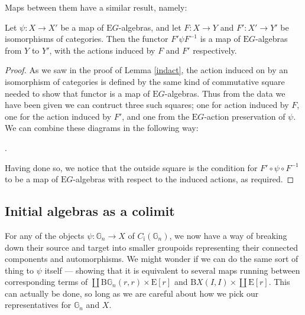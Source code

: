 \documentclass{amsart} %
\newenvironment{eq*}{\begin{equation*}}{\end{equation*}}
\begin{document}
Maps between them have a similar result, namely:

\begin{lem}\label{indmap} Let $\psi: X \to X'$ be a map of $\mathrm{E}G$-algebras, and let $F: X \to Y$ and $F': X' \to Y'$ be isomorphisms of categories. Then the functor $F' \psi F^{-1}$ is a map of $\mathrm{E}G$-algebras from $Y$ to $Y'$,  with the actions induced by $F$ and $F'$ respectively.
\end{lem}
\begin{proof}
As we saw in the proof of Lemma \ref{indact}, the action induced on by an isomorphism of categories is defined by the same kind of commutative square needed to show that functor is a map of $\mathrm{E}G$-algebras. Thus from the data we have been given we can contruct three such squares; one for action induced by $F$, one for the action induced by $F'$, and one from the  $\mathrm{E}G$-action preservation of $\psi$. We can combine these diagrams in the following way:
\begin{eq*} .
\end{eq*}
Having done so, we notice that the outside square is the condition for $F' \circ \psi \circ F^{-1}$ to be a map of $\mathrm{E}G$-algebras with respect to the induced actions, as required.
\end{proof}

\subsection{Initial algebras as a colimit}

For any of the objects $\psi : \mathbb{G}_n \to X$ of $C_{\mathrm{i}}(\mathbb{G}_n)$, we now have a way of breaking down their source and target into smaller groupoids representing their connected components and automorphisms. We might wonder if we can do the same sort of thing to $\psi$ itself --- showing that it is equivalent to several maps running between corresponding terms of $\coprod \mathrm{B}\mathbb{G}_n(r, r) \times \mathrm{E}[r]$ and $\mathrm{B}X(I,I) \times \coprod \mathrm{E}[r]$. This can actually be done, so long as we are careful about how we pick our representatives for $\mathbb{G}_n$ and $X$.
\end{document}
